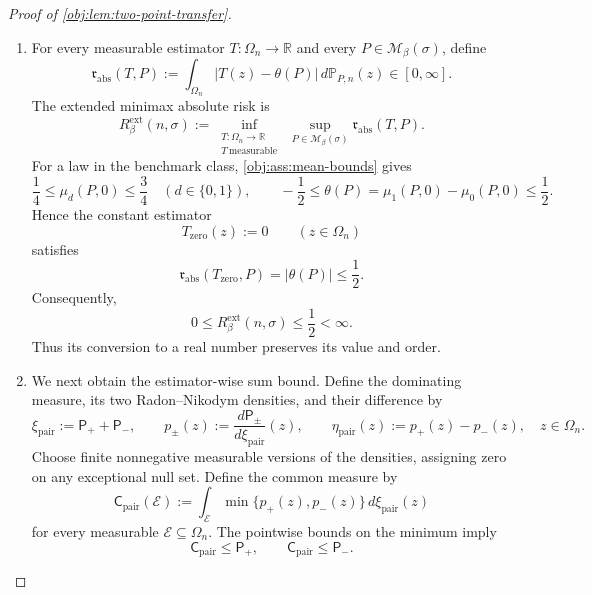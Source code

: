 \begin{proof}[Proof of \cref{obj:lem:two-point-transfer}]
\begin{enumerate}
\item
For every measurable estimator \(T:\Omega_n\to\mathbb R\) and every \(P\in\mathcal M_\beta(\sigma)\), define
\[
\mathfrak r_{\mathrm{abs}}(T,P)
:=
\int_{\Omega_n}|T(z)-\theta(P)|\,d\mathbb P_{P,n}(z)
\in[0,\infty].
\]
The extended minimax absolute risk is
\[
R^{\mathrm{ext}}_\beta(n,\sigma)
:=
\inf_{\substack{T:\Omega_n\to\mathbb R\\T\ \mathrm{measurable}}}
\ \sup_{P\in\mathcal M_\beta(\sigma)}
\mathfrak r_{\mathrm{abs}}(T,P).
\]
For a law in the benchmark class, \cref{obj:ass:mean-bounds} gives
\[
\frac14\le\mu_d(P,0)\le\frac34
\quad(d\in\{0,1\}),
\qquad
-\frac12
\le
\theta(P)=\mu_1(P,0)-\mu_0(P,0)
\le\frac12.
\]
Hence the constant estimator
\[
T_{\mathrm{zero}}(z):=0
\qquad(z\in\Omega_n)
\]
satisfies
\[
\mathfrak r_{\mathrm{abs}}(T_{\mathrm{zero}},P)
=
|\theta(P)|
\le\frac12.
\]
Consequently,
\[
0\le R^{\mathrm{ext}}_\beta(n,\sigma)\le\frac12<\infty.
\]
Thus its conversion to a real number preserves its value and order.

\item
We next obtain the estimator-wise sum bound. Define the dominating measure, its two Radon--Nikodym densities, and their difference by
\[
\xi_{\mathrm{pair}}:=\mathsf P_++\mathsf P_-,
\qquad
p_\pm(z):=\frac{d\mathsf P_\pm}{d\xi_{\mathrm{pair}}}(z),
\qquad
\eta_{\mathrm{pair}}(z):=p_+(z)-p_-(z),
\quad z\in\Omega_n.
\]
Choose finite nonnegative measurable versions of the densities, assigning zero on any exceptional null set. Define the common measure by
\[
\mathsf C_{\mathrm{pair}}(\mathcal E)
:=
\int_{\mathcal E}\min\{p_+(z),p_-(z)\}\,d\xi_{\mathrm{pair}}(z)
\]
for every measurable \(\mathcal E\subseteq\Omega_n\). The pointwise bounds on the minimum imply
\[
\mathsf C_{\mathrm{pair}}\le\mathsf P_+,
\qquad
\mathsf C_{\mathrm{pair}}\le\mathsf P_-.
\]


\end{enumerate}
\end{proof}
